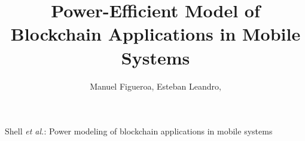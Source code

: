 \documentclass[journal]{IEEEtran}
\begin{document}
%
\title{ Power-Efficient Model of Blockchain Applications in Mobile Systems }
%
%
%

\author{Manuel Figueroa,
        Esteban Leandro,}%

% 
%



%
{Shell \MakeLowercase{\textit{et al.}}: Power modeling of blockchain applications in mobile systems }
% 
\end{document}
